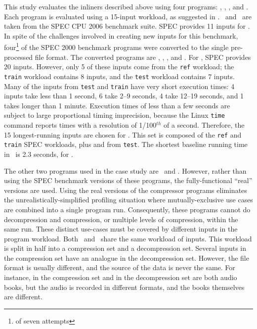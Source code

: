 This study evaluates the inliners described above using four
programs: \bzip, \gzip, \gcc, and \gobmk.  Each program is evaluated
using a 15-input workload, as suggested
in \cite{BerubePhD}.  \Gcc\ and \gobmk\ are taken from the
SPEC CPU 2006 benchmark suite.  SPEC provides 11 inputs for \gcc.  In
spite of the challenges involved in creating new inputs for this
benchmark, four\footnote{of seven attempts} of the SPEC 2000 benchmark
programs were converted to the single pre-processed file format.  The
converted programs are \bzip, \lbm, \mcf, and \parser.  For \gobmk,
SPEC provides 20 inputs.  However, only 5 of these inputs come from
the {\tt ref} workload; the {\tt train} workload contains 8 inputs,
and the {\tt test} workload contains 7 inputs.  Many of the inputs from
{\tt test} and {\tt train} have very short execution times: 4 inputs
take less than 1 second, 6 take 2--9 seconds, 4 take 12--19 seconds,
and 1 takes longer than 1 minute.  Execution times of less than a few
seconds are subject to large proportional timing imprecision, because
the Linux {\tt time} command reports times with a resolution of
1/100$^{th}$ of a second.  Therefore, the 15 longest-running inputs
are chosen for \Wfull.  This set is composed of the {\tt ref} and {\tt
train} SPEC workloads, plus  and  from
{\tt test}.  The shortest baseline running time in \Wfull\ is 2.3
seconds, for .

The other two programs used in the case study are \bzip\ and \gzip.
However, rather than using the SPEC benchmark versions of these
programs, the fully-functional ``real'' versions are used.  Using the
real versions of the compressor programs eliminates the
unrealistically-simplified profiling situation where
mutually-exclusive use cases are combined into a single program run.
Consequently, these programs cannot do decompression and compression,
or multiple levels of compression, within the same run.  These
distinct use-cases must be covered by different inputs in the program
workload.  Both \bzip\ and \gzip\ share the same workload of inputs.
This workload is split in half into a compression set and a
decompression set.  Several inputs in the compression set have an
analogue in the decompression set.  However, the file format is
usually different, and the source of the data is never the same.  For
instance,  in the compression set
and  in the decompression set are both audio
books, but the audio is recorded in different formats, and the books
themselves are different.

